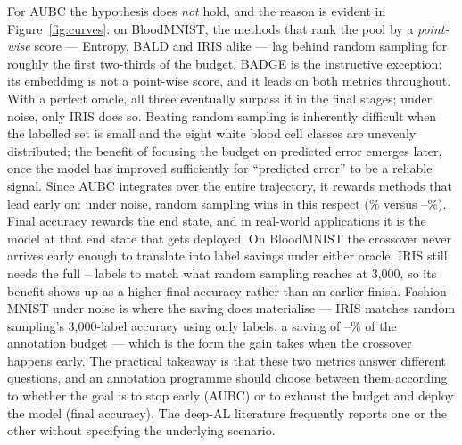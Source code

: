 \documentclass[a4paper,fleqn,longmktitle]{cas-sc}
\newcommand{\method}{IRIS}
\providecommand{\BloodNoisyIrisAubc}{--}\providecommand{\BloodNoisyIrisAubcStd}{--}
\providecommand{\BloodCleanIrisMatchBudget}{--}\providecommand{\BloodCleanIrisLabelSaving}{--}
\providecommand{\FmnistNoisyIrisLabelSaving}{--}\providecommand{\CifarNoisyNSeeds}{--}
\begin{document}
For AUBC the hypothesis does \emph{not} hold, and the reason is evident
in Figure~\ref{fig:curves}: on BloodMNIST, the methods that rank the
pool by a \emph{point-wise} score --- Entropy, BALD and \method{} alike
--- lag behind random sampling for roughly the first two-thirds of the
budget. BADGE is the instructive exception: its embedding is not a
point-wise score, and it leads on both metrics throughout. With a perfect
oracle, all three eventually surpass it in the final stages; under
noise, only \method{} does so. Beating random sampling is inherently
difficult when the labelled set is small and the eight white blood cell
classes are unevenly distributed; the benefit of focusing the budget on
predicted error emerges later, once the model has improved sufficiently
for ``predicted error'' to be a reliable signal. Since AUBC integrates
over the entire trajectory, it rewards methods that lead early on:
under noise, random sampling wins in this respect
(\BloodNoisyRandomAubc\% versus \BloodNoisyIrisAubc\%). Final accuracy
rewards the end state, and in real-world applications it is the model
at that end state that gets deployed. On BloodMNIST the crossover never
arrives early enough to translate into label savings under either
oracle: \method{} still needs the full
\BloodCleanIrisMatchBudget{} labels to match what random sampling
reaches at 3,000, so its benefit shows up as a higher final accuracy
rather than an earlier finish. Fashion-MNIST under noise is where the
saving does materialise --- \method{} matches random sampling's
3,000-label accuracy using only \FmnistNoisyIrisMatchBudget{} labels,
a saving of \FmnistNoisyIrisLabelSaving\% of the annotation budget ---
which is the form the gain takes when the crossover happens early. The practical takeaway is that these two metrics answer
different questions, and an annotation programme should choose between
them according to whether the goal is to stop early (AUBC) or to
exhaust the budget and deploy the model (final accuracy). The deep-AL
literature frequently reports one or the other without specifying the
underlying scenario.
\end{document}
